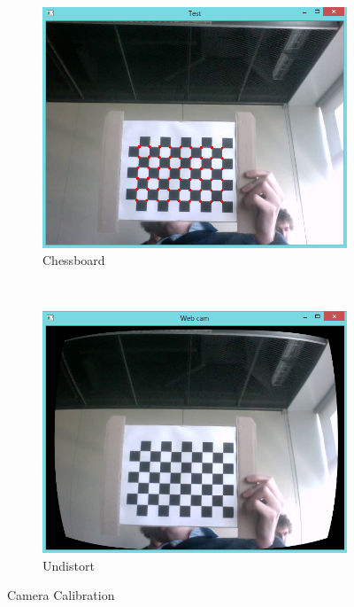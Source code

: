  \begin{figure}[h!]
	\begin{subfigure}[b]{0.5\textwidth}
		\includegraphics[width=\textwidth]{final/images/patterndot.jpg}
		\caption{Chessboard}
		\label{subfig:chesspattern}
	\end{subfigure}
	~
	\begin{subfigure}[b]{0.5\textwidth}
		\includegraphics[width=\textwidth]{final/images/undistort.jpg}
		\caption{Undistort}
		\label{subfig:undistort}
	\end{subfigure}
	
	\caption{Camera Calibration}
\end{figure}
 
